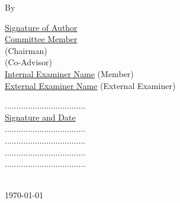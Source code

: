 \documentclass[
11pt, %
oneside, %
english, %
onehalfspacing, %
liststotoc, %
toctotoc, %
parskip, %
]{MastersDoctoralThesis} %
\begin{document}
\newpage
\begin{center}
\vspace*{2.5cm}
{\Large \bfseries \MakeUppercase \ttitle\par}\vspace{2cm}
{\Large By}\\[.3cm]
{\Large \bfseries \href{http://students.just.edu.jo/~119202}{\authorname}\par}\vspace{1cm}
\vfill
\begin{minipage}[t]{0.6\textwidth}
\begin{flushleft} \Large
\underline{Signature of Author}\\[2cm]
\underline{Committee Member}\\ \bigskip \doublespacing
\href{http://students.just.edu.jo/~119202}{\supname} (Chairman)\\
\href{http://students.just.edu.jo/~119202}{\coname} (Co-Advisor)\\
\href{http://students.just.edu.jo/~119202}{Internal Examiner Name} (Member)\\
\href{http://students.just.edu.jo/~119202}{External Examiner Name} (External Examiner)

\end{flushleft}
\end{minipage}
\begin{minipage}[t]{0.39\textwidth}
\begin{flushright} \Large\centering
...................................\\[2cm]
\underline{Signature and Date \hspace{1em}}\\ \bigskip \doublespacing
...................................\\
...................................\\
...................................\\
...................................
\end{flushright}
\end{minipage}\\[3cm]
\vfill
{\Large \monthyeardate\today}\\[10cm]
\vfill
\end{center}
\newpage

\end{document}
